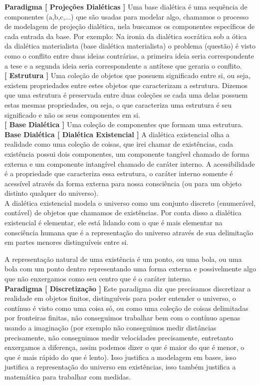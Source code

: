 \textbf{Paradigma [ Projeções Dialéticas ]} Uma base dialética é uma sequência de componentes (a,b,c,...) que são usadas para modelar algo, chamamos o processo de modelagem de projeção dialética, nela buscamos os componentes específicos de cada entrada da base. Por exemplo: Na ironia da dialética socrática sob a ótica da dialética materialista (base dialética materialista) o problema (questão) é visto como o conflito entre duas ideias contrárias, a primeira ideia seria correspondente a tese e a segunda ideia seria correspondente a antítese que geraria o conflito.\\

\textbf{[ Estrutura ]} Uma coleção de objetos que possuem significado entre si, ou seja, existem propriedades entre estes objetos que caracterizam a estrutura. Dizemos que uma estrutura é preservada entre duas coleções se cada uma delas possuem estas mesmas propriedades, ou seja, o que caracteriza uma estrutura é seu significado e não os seus componentes em si.\\

\textbf{[ Base Dialética ]} Uma coleção de componentes que formam uma estrutura.\\

\textbf{Base Dialética [ Dialética Existencial ]} A dialética existencial olha a realidade como uma coleção de coisas, que irei chamar de existências, cada existência possui dois componentes, um componente tangível chamado de forma externa e um componente intangível chamado de caráter interno. A acessibilidade é a propriedade que caracteriza essa estrutura, o caráter interno somente é acessível através da forma externa para nossa consciência (ou para um objeto distinto qualquer do universo).\\

A dialética existencial modela o universo como um conjunto discreto (enumerável, contável) de objetos que chamamos de existências. Por conta disso a dialética existencial é elementar, ele está lidando com o que é mais elementar na consciência humana que é a representação do universo através de sua delimitação em partes menores distinguíveis entre si. 

A representação natural de uma existência é um ponto, ou uma bola, ou uma bola com um ponto dentro representando uma forma externa e possivelmente algo que não enxergamos como seu centro que é o caráter interno.\\

\textbf{Paradigma [ Discretização ]} Este paradigma diz que precisamos discretizar a realidade em objetos finitos, distinguíveis para poder entender o universo, o contínuo é visto como uma coisa só, ou como uma coleção de coisas delimitadas por fronteiras finitas, não conseguimos trabalhar bem com o contínuo apenas usando a imaginação (por exemplo não conseguimos medir distâncias precisamente, não conseguimos medir velocidades precisamente, entretanto enxergamos a diferença, assim podemos dizer o que é maior do que é menor, o que é mais rápido do que é lento). Isso justifica a modelagem em bases, isso justifica a representação do universo em existências, isso também justifica a matemática para trabalhar com medidas.\\

